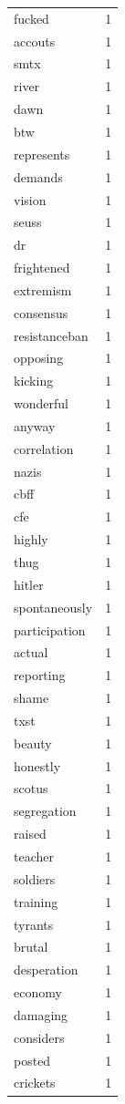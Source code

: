 \begin{tabular}{lr}
fucked & 1 \\
accouts & 1 \\
smtx & 1 \\
river & 1 \\
dawn & 1 \\
btw & 1 \\
represents & 1 \\
demands & 1 \\
vision & 1 \\
seuss & 1 \\
dr & 1 \\
frightened & 1 \\
extremism & 1 \\
consensus & 1 \\
resistanceban & 1 \\
opposing & 1 \\
kicking & 1 \\
wonderful & 1 \\
anyway & 1 \\
correlation & 1 \\
nazis & 1 \\
cbff & 1 \\
cfe & 1 \\
highly & 1 \\
thug & 1 \\
hitler & 1 \\
spontaneously & 1 \\
participation & 1 \\
actual & 1 \\
reporting & 1 \\
shame & 1 \\
txst & 1 \\
beauty & 1 \\
honestly & 1 \\
scotus & 1 \\
segregation & 1 \\
raised & 1 \\
teacher & 1 \\
soldiers & 1 \\
training & 1 \\
tyrants & 1 \\
brutal & 1 \\
desperation & 1 \\
economy & 1 \\
damaging & 1 \\
considers & 1 \\
posted & 1 \\
crickets & 1 \\

\end{tabular}

